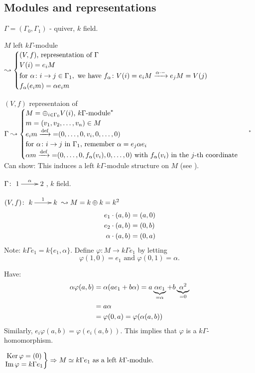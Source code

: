 \subsection{Modules and representations}

$\Gamma = (\Gamma_0,\Gamma_1)$ - quiver, $k$ field.

$M$ left $k\Gamma$-module $\leadsto\begin{cases}
(V,f) \text{, representation of $\Gamma$}\\
V(i) = e_iM\\
\text{for\ } \alpha\colon i\to j \in \Gamma_1, \text{\ we have\ }  f_\alpha\colon
V(i)=e_iM\extto{\alpha\cdot -} e_jM = V(j)\\
f_\alpha(e_im) = \alpha e_im
\end{cases}$

$(V,f)$ representaion of $\Gamma\leadsto \begin{cases}
M = \oplus_{i\in\Gamma_0} V(i) \textrm{, $k\Gamma$-module}^*\\
m = (v_1,v_2,\ldots, v_n) \in M\\
e_im \xrightarrow{\text{def}}{=} (0,\ldots,0,v_i,0,\ldots,0)\\
\text{for $\alpha\colon i\to j$ in $\Gamma_1$, remember $\alpha =
  e_j\alpha e_i$}\\
\alpha m \xrightarrow{\text{def}}{=} (0,\ldots,0,f_\alpha(v_i),0,\ldots,0)
\text{\ with $f_\alpha(v_i)$ in the $j$-th coordinate}
\end{cases}$\medskip 
$^*$Can show: This induces a left $k\Gamma$-module structure on $M$
(see \cite[page 57]{ARS}). 
\begin{exam}
$\Gamma\colon \xymatrix{1\ar[r]^\alpha & 2}$, $k$ field.

$(V,f)\colon \xymatrix{k\ar[r]^1 & k} \leadsto M = k\oplus k = k^2$
\begin{align}
e_1\cdot (a,b) & = (a, 0)\notag\\
e_2\cdot (a,b) & = (0,b)\notag\\
\alpha\cdot(a,b) & = (0,a)\notag
\end{align}
Note: $k\Gamma e_1 = k\{ e_1,\alpha\}$.  Define $\varphi\colon M\to
k\Gamma e_1$ by letting 
\[\varphi(1,0) = e_1 \text{\ and\ } \varphi(0,1) = \alpha.\]

Have: 
\begin{align}
\alpha \varphi(a,b)  & = \alpha(ae_1 + b\alpha) =
a\underbrace{\alpha e_1}_{=\alpha} +
                       b\underbrace{\alpha^2}_{=0}\notag\\
& = a\alpha\notag\\
& = \varphi(0,a) = \varphi(\alpha(a,b))\notag
\end{align} 
Similarly, $e_i\varphi(a,b) = \varphi(e_i(a,b))$. This implies that
$\varphi$ is a $k\Gamma$-homomorphism.\medskip 

$\left.\begin{matrix}
\operatorname{Ker}\nolimits \varphi = (0)\\
\operatorname{Im}\nolimits\varphi = k\Gamma e_1
\end{matrix}\right\} \Rightarrow M\simeq k\Gamma e_1 \text{\ as a left $k\Gamma$-module}.$
\end{exam}

